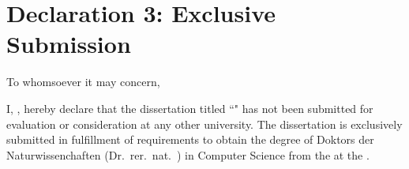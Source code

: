 \documentclass[a4paper,12pt,leqno,openbib]{memoir}
\begin{document}
{}

\chapter*{Declaration 3: Exclusive Submission}
\vspace{4cm}

To whomsoever it may concern,

I, \utsname, hereby declare that the dissertation titled ``\utstitle" has not been submitted for evaluation or consideration at any other university. The dissertation is exclusively submitted in fulfillment of requirements to obtain the degree of Doktors der Naturwissenchaften (Dr.~rer.~nat.~) in Computer Science from the \utsfaculty at the \utsuniv. 


\noindent

\vspace{4cm}
\noindent
{}
\end{document}
